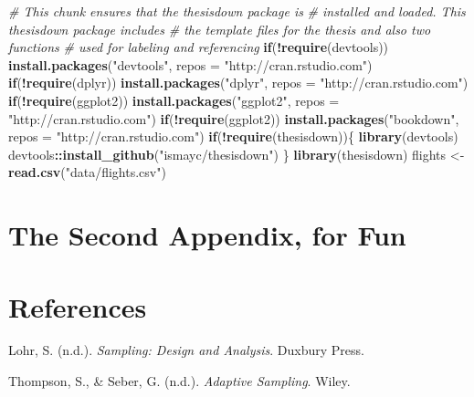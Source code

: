 \documentclass[12pt,twoside]{reedthesis}
\newenvironment{Shaded}{\begin{snugshade}}{\end{snugshade}}
\newcommand{\CommentTok}[1]{\textcolor[rgb]{0.56,0.35,0.01}{\textit{#1}}}
\newcommand{\ControlFlowTok}[1]{\textcolor[rgb]{0.13,0.29,0.53}{\textbf{#1}}}
\newcommand{\DataTypeTok}[1]{\textcolor[rgb]{0.13,0.29,0.53}{#1}}
\newcommand{\KeywordTok}[1]{\textcolor[rgb]{0.13,0.29,0.53}{\textbf{#1}}}
\newcommand{\NormalTok}[1]{#1}
\newcommand{\OperatorTok}[1]{\textcolor[rgb]{0.81,0.36,0.00}{\textbf{#1}}}
\newcommand{\StringTok}[1]{\textcolor[rgb]{0.31,0.60,0.02}{#1}}
\begin{document}
\begin{Shaded}
\begin{Highlighting}[]
\CommentTok{# This chunk ensures that the thesisdown package is}
\CommentTok{# installed and loaded. This thesisdown package includes}
\CommentTok{# the template files for the thesis and also two functions}
\CommentTok{# used for labeling and referencing}
\ControlFlowTok{if}\NormalTok{(}\OperatorTok{!}\KeywordTok{require}\NormalTok{(devtools))}
  \KeywordTok{install.packages}\NormalTok{(}\StringTok{"devtools"}\NormalTok{, }\DataTypeTok{repos =} \StringTok{"http://cran.rstudio.com"}\NormalTok{)}
\ControlFlowTok{if}\NormalTok{(}\OperatorTok{!}\KeywordTok{require}\NormalTok{(dplyr))}
    \KeywordTok{install.packages}\NormalTok{(}\StringTok{"dplyr"}\NormalTok{, }\DataTypeTok{repos =} \StringTok{"http://cran.rstudio.com"}\NormalTok{)}
\ControlFlowTok{if}\NormalTok{(}\OperatorTok{!}\KeywordTok{require}\NormalTok{(ggplot2))}
    \KeywordTok{install.packages}\NormalTok{(}\StringTok{"ggplot2"}\NormalTok{, }\DataTypeTok{repos =} \StringTok{"http://cran.rstudio.com"}\NormalTok{)}
\ControlFlowTok{if}\NormalTok{(}\OperatorTok{!}\KeywordTok{require}\NormalTok{(ggplot2))}
    \KeywordTok{install.packages}\NormalTok{(}\StringTok{"bookdown"}\NormalTok{, }\DataTypeTok{repos =} \StringTok{"http://cran.rstudio.com"}\NormalTok{)}
\ControlFlowTok{if}\NormalTok{(}\OperatorTok{!}\KeywordTok{require}\NormalTok{(thesisdown))\{}
  \KeywordTok{library}\NormalTok{(devtools)}
\NormalTok{  devtools}\OperatorTok{::}\KeywordTok{install_github}\NormalTok{(}\StringTok{"ismayc/thesisdown"}\NormalTok{)}
\NormalTok{  \}}
\KeywordTok{library}\NormalTok{(thesisdown)}
\NormalTok{flights <-}\StringTok{ }\KeywordTok{read.csv}\NormalTok{(}\StringTok{"data/flights.csv"}\NormalTok{)}
\end{Highlighting}
\end{Shaded}
\hypertarget{the-second-appendix-for-fun}{%
\chapter{The Second Appendix, for Fun}\label{the-second-appendix-for-fun}}

\backmatter

\hypertarget{references}{%
\chapter*{References}\label{references}}


\noindent

\setlength{\parindent}{-0.20in}
\setlength{\leftskip}{0.20in}
\setlength{\parskip}{8pt}

\hypertarget{refs}{}
\leavevmode\hypertarget{ref-lohr_sampling}{}%
Lohr, S. (n.d.). \emph{Sampling: Design and Analysis}. Duxbury Press.

\leavevmode\hypertarget{ref-thompson_adaptive}{}%
Thompson, S., \& Seber, G. (n.d.). \emph{Adaptive Sampling}. Wiley.


\end{document}
